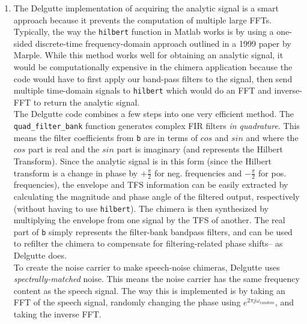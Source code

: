 \documentclass[9pt]{extarticle}
\begin{document}
\begin{enumerate}[label = \alph*)]

\item The Delgutte implementation of acquiring the analytic signal is a smart approach because it prevents the computation of multiple large FFTs. Typically, the way the \verb|hilbert| function in Matlab works is by using a one-sided discrete-time frequency-domain approach outlined in a 1999 paper by Marple. While this method works well for obtaining an analytic signal, it would be computationally expensive in the chimera application because the code would have to first apply our band-pass filters to the signal, then send multiple time-domain signals to \verb|hilbert| which would do an FFT and inverse-FFT to return the analytic signal. \\

The Delgutte code combines a few steps into one very efficient method. The \verb|quad_filter_bank| function generates complex FIR filters \textit{in quadrature}. This means the filter coefficients from \verb|b| are in terms of $cos$ and $sin$ and where the $cos$ part is real and the $sin$ part is imaginary (and represents the Hilbert Transform). Since the analytic signal is in this form (since the Hilbert transform is a change in phase by $+\frac{\pi}{2}$ for neg. frequencies and $-\frac{\pi}{2}$ for pos. frequencies), the envelope and TFS information can be easily extracted by calculating the magnitude and phase angle of the filtered output, respectively (without having to use \verb|hilbert|). The chimera is then synthesized by multiplying the envelope from one signal by the TFS of another. The real part of \verb|b| simply represents the filter-bank bandpass filters, and can be used to refilter the chimera to compensate for filtering-related phase shifts-- as Delgutte does. \\

To create the noise carrier to make speech-noise chimeras, Delgutte uses \textit{spectrally-matched} noise. This means the noise carrier has the same frequency content as the speech signal. The way this is implemented is by taking an FFT of the speech signal, randomly changing the phase using $e^{2\pi j \omega_{random}}$, and taking the inverse FFT. 


\end{enumerate}
\end{document}
